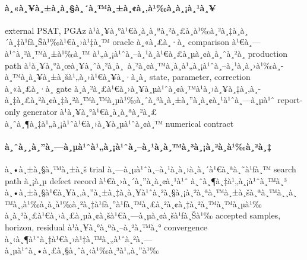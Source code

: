 ﻿\documentclass[12pt,a4paper]{article}
\begin{document}
\paragraph{à¸«à¸¥à¸±à¸à¸§à¸´à¸™à¸±à¸¢à¸‚à¹‰à¸­à¸¡à¸¹à¸¥}
external PSAT, PGAz à¹à¸¥à¸°à¹€à¸­à¸à¸ªà¸²à¸£à¸­à¹‰à¸²à¸‡à¸­à¸´à¸‡à¹ƒà¸Šà¹‰à¹€à¸›à¹‡à¸™ oracle à¸«à¸£à¸·à¸­ comparison à¹€à¸—à¹ˆà¸²à¸™à¸±à¹‰à¸™
à¹„à¸¡à¹ˆà¸–à¸¹à¸à¹€à¸£à¸µà¸¢à¸à¸ˆà¸²à¸ production path à¹à¸¥à¸°à¸œà¸¥à¸ˆà¸²à¸à¸ à¸²à¸¢à¸™à¸­à¸à¹„à¸¡à¹ˆà¸–à¸¹à¸à¸›à¹‰à¸­à¸™à¸à¸¥à¸±à¸šà¹„à¸›à¹€à¸¥à¸·à¸­à¸ state,
parameter, correction à¸«à¸£à¸·à¸­ gate à¸à¸²à¸£à¹€à¸›à¸¥à¸µà¹ˆà¸¢à¸™à¹à¸›à¸¥à¸‡à¸‚à¸­à¸‡à¸£à¸²à¸¢à¸‡à¸²à¸™à¸™à¸µà¹‰à¸ˆà¸³à¸à¸±à¸”à¸­à¸¢à¸¹à¹ˆà¸—à¸µà¹ˆ
report-only generator à¹à¸¥à¸°à¹€à¸­à¸à¸ªà¸²à¸£ à¸ˆà¸¶à¸‡à¹„à¸¡à¹ˆà¹€à¸›à¸¥à¸µà¹ˆà¸¢à¸™ numerical contract

\paragraph{à¸ˆà¸¸à¸”à¸—à¸µà¹ˆà¹„à¸¡à¹ˆà¸–à¸¹à¸à¸™à¸³à¸¡à¸²à¸­à¹‰à¸²à¸‡}
à¸•à¸±à¸§à¸™à¸±à¸š trial à¸—à¸µà¹ˆà¸–à¸¹à¸à¸›à¸à¸´à¹€à¸ªà¸˜à¹ƒà¸™ search path à¸¡à¸µ defect record à¹€à¸›à¸´à¸”à¸­à¸¢à¸¹à¹ˆ à¸ˆà¸¶à¸‡à¹„à¸¡à¹ˆà¸™à¸³
à¸•à¸±à¸§à¹€à¸¥à¸‚à¸”à¸±à¸‡à¸à¸¥à¹ˆà¸²à¸§à¸¡à¸²à¸ªà¸™à¸±à¸šà¸ªà¸™à¸¸à¸™à¸‚à¹‰à¸­à¸­à¹‰à¸²à¸‡à¹ƒà¸”à¹ƒà¸™à¸£à¸²à¸¢à¸‡à¸²à¸™à¸™à¸µà¹‰ à¸à¸²à¸£à¹€à¸›à¸£à¸µà¸¢à¸šà¹€à¸—à¸µà¸¢à¸šà¹ƒà¸Šà¹‰ accepted
samples, horizon, residual à¹à¸¥à¸°à¸ªà¸–à¸²à¸™à¸° convergence à¸‹à¸¶à¹ˆà¸‡à¹€à¸›à¹‡à¸™à¸„à¹ˆà¸²à¸—à¸µà¹ˆà¸•à¸£à¸§à¸ˆà¸‹à¹‰à¸³à¹„à¸”à¹‰

\par\vspace{5pt}
\end{document}
